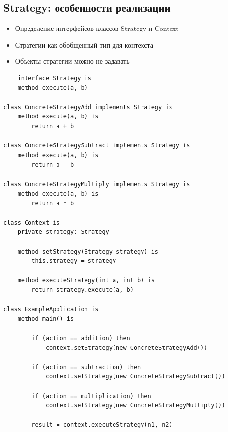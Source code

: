 \subsection{Strategy: особенности реализации}
\begin{itemize}
    \item Определение интерфейсов классов Strategy и Context
    \item Стратегии как обобщенный тип для контекста
    \item Объекты-стратегии можно не задавать
\end{itemize}
\begin{lstlisting}
    interface Strategy is
    method execute(a, b)

class ConcreteStrategyAdd implements Strategy is
    method execute(a, b) is
        return a + b

class ConcreteStrategySubtract implements Strategy is
    method execute(a, b) is
        return a - b

class ConcreteStrategyMultiply implements Strategy is
    method execute(a, b) is
        return a * b

class Context is
    private strategy: Strategy

    method setStrategy(Strategy strategy) is
        this.strategy = strategy

    method executeStrategy(int a, int b) is
        return strategy.execute(a, b)

class ExampleApplication is
    method main() is

        if (action == addition) then
            context.setStrategy(new ConcreteStrategyAdd())

        if (action == subtraction) then
            context.setStrategy(new ConcreteStrategySubtract())

        if (action == multiplication) then
            context.setStrategy(new ConcreteStrategyMultiply())

        result = context.executeStrategy(n1, n2)
\end{lstlisting}

